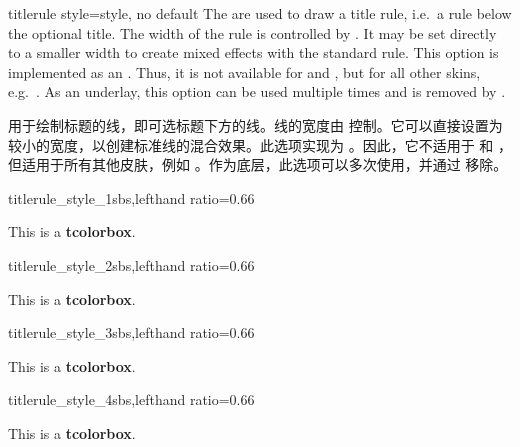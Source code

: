 \begin{docTcbKey}[][doc new=2015-01-14]{titlerule style}{=}{style, no default}
The  are used to draw a title rule,
i.e.\ a rule below the optional title. The width of the rule is controlled
by . It may be set directly to a smaller width
to create mixed effects with the standard rule.
This option is implemented as an . Thus, it is not
available for  and , but for
all other skins, e.g.\ .
As an underlay, this option can be used multiple times and is removed
by .

 用于绘制标题的线，即可选标题下方的线。线的宽度由  控制。它可以直接设置为较小的宽度，以创建标准线的混合效果。此选项实现为 。因此，它不适用于  和 ，但适用于所有其他皮肤，例如 。作为底层，此选项可以多次使用，并通过  移除。
\begin{exdispExample*}{titlerule_style_1}{sbs,lefthand ratio=0.66}
\begin{tcolorbox}[enhanced,
colback=red!5!white,colframe=red!75!black,
colbacktitle=red!50!yellow,fonttitle=\bfseries,
title=My title,
titlerule=1mm,
titlerule style=yellow  ]
This is a \textbf{tcolorbox}.
\end{tcolorbox}
\end{exdispExample*}

\begin{exdispExample*}{titlerule_style_2}{sbs,lefthand ratio=0.66}
\begin{tcolorbox}[enhanced,
colback=red!5!white,colframe=red!75!black,
colbacktitle=red!50!yellow,fonttitle=\bfseries,
title=My title,
titlerule=1mm,
titlerule style={yellow,line width=0.5mm}  ]
This is a \textbf{tcolorbox}.
\end{tcolorbox}
\end{exdispExample*}

\begin{exdispExample*}{titlerule_style_3}{sbs,lefthand ratio=0.66}
\begin{tcolorbox}[enhanced,
colback=red!10!white,colframe=red!75!black,
colbacktitle=red!50!yellow,fonttitle=\bfseries,
frame hidden,
title=My title,
boxrule=0pt,titlerule=1mm,
titlerule style=red!50!black  ]
This is a \textbf{tcolorbox}.
\end{tcolorbox}
\end{exdispExample*}

\begin{exdispExample*}{titlerule_style_4}{sbs,lefthand ratio=0.66}
\begin{tcolorbox}[empty,
  coltitle=red!75!black,fonttitle=\bfseries,
  borderline horizontal={0.5mm}{0pt}{red!50!white},
  title=My title,
  titlerule style={red,
    arrows = {Hooks[arc=270]-Hooks[arc=270]}} ]
This is a \textbf{tcolorbox}.
\end{tcolorbox}
\end{exdispExample*}
\end{docTcbKey}

